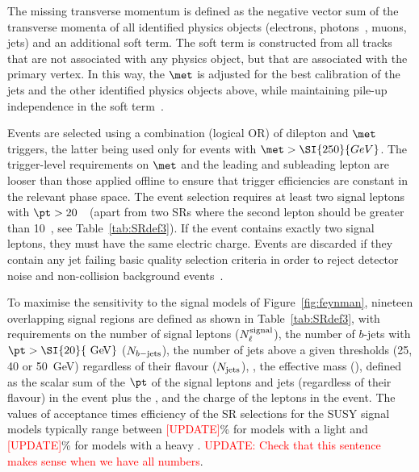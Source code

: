 The missing transverse momentum is defined as the negative vector sum of the transverse momenta 
of all identified physics objects (electrons, photons~\cite{ATLAS-CONF-2012-123}, muons, jets) and an additional soft term. 
The soft term is constructed from all tracks that are not associated with any physics object, 
but that are associated with the primary vertex. 
In this way, the $\met$ is adjusted for the best calibration of the jets and the other identified physics objects above, 
while maintaining pile-up independence in the soft term~\cite{ATL-PHYS-PUB-2015-027, ATL-PHYS-PUB-2015-023}.

Events are selected using a combination (logical OR) of dilepton and $\met$ triggers, 
the latter being used only for events with $\met>\SI{250}{GeV}$. 
The trigger-level requirements on $\met$ and the leading and subleading lepton \pt are looser than those applied offline 
to ensure that trigger efficiencies are constant in the relevant phase space. 
The event selection requires at least two signal leptons with $\pt>20$~\GeV~(apart from two SRs where 
the second lepton \pt should be greater than 10~\GeV, see Table~\ref{tab:SRdef3}). 
If the event contains exactly two signal leptons, they must have the same electric charge. 
Events are discarded if they contain any jet failing basic quality selection criteria in order to 
reject detector noise and non-collision background events~\cite{ATLAS-CONF-2010-038}.

To maximise the sensitivity to the signal models of Figure~\ref{fig:feynman}, 
nineteen overlapping signal regions are defined as shown in Table~\ref{tab:SRdef3}, with requirements on the number of signal leptons 
($N_{\ell}^{\rm{signal}}$), the number of $b$-jets with $\pt>\SI{20}{\GeV}$ ($N_{b\rm{-jets}}$), 
the number of jets above a given \pt thresholds (25, 40 or \SI{50}{GeV}) regardless of their flavour ($N_{\rm{jets}}$), 
\met, the effective mass (\meff), defined as the scalar sum of the $\pt$ of the signal leptons and jets (regardless of their flavour) 
in the event plus the \met, and the charge of the leptons in the event. 
The values of acceptance times efficiency of the SR selections for the SUSY signal models 
typically range between \textcolor{red}{[UPDATE]}\% for models with a light \ninoone and \textcolor{red}{[UPDATE]}\% for models with a heavy \ninoone. 
\textcolor{red}{UPDATE: Check that this sentence makes sense when we have all numbers}.


